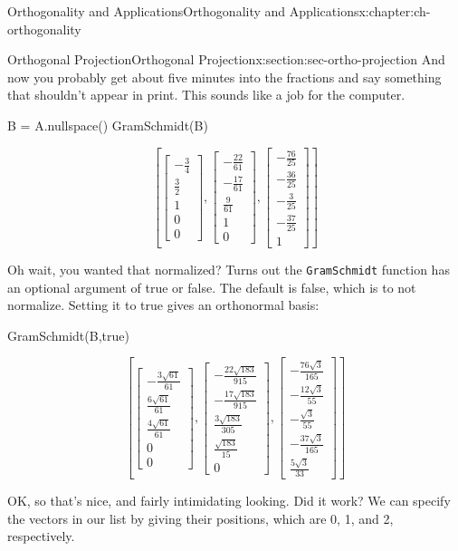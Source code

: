 \documentclass[oneside,10pt,]{book}
\newcommand{\mono}[1]{\texttt{#1}}
\numberwithin{equation}{section}
\newcommand{\bbm}{\begin{bmatrix}}
\newcommand{\ebm}{\end{bmatrix}}
\begin{document}
\begin{chapterptx}{Orthogonality and Applications}{}{Orthogonality and Applications}{}{}{x:chapter:ch-orthogonality}
\begin{sectionptx}{Orthogonal Projection}{}{Orthogonal Projection}{}{}{x:section:sec-ortho-projection}
And now you probably get about five minutes into the fractions and say something that shouldn't appear in print. This sounds like a job for the computer.%
\begin{sageinput}
B = A.nullspace()
GramSchmidt(B)
\end{sageinput}
\begin{sageoutput}
\[\left[\bbm -\frac34\\ \frac32\\1\\0\\0\ebm, \bbm -\frac{22}{61}\\-\frac{17}{61}\\ \frac{9}{61}\\1\\0\ebm, \bbm -\frac{76}{25}\\-\frac{36}{25}\\-\frac{3}{25}\\-\frac{37}{25}\\1\ebm\right]\]
\end{sageoutput}
Oh wait, you wanted that normalized? Turns out the \mono{GramSchmidt} function has an optional argument of true or false. The default is false, which is to not normalize. Setting it to true gives an orthonormal basis:%
\begin{sageinput}
GramSchmidt(B,true)
\end{sageinput}
\begin{sageoutput}
\[\left[\bbm -\frac{3\sqrt{61}}{61}\\ \frac{6\sqrt{61}}{61}\\ \frac{4\sqrt{61}}{61}\\0\\0\ebm,
\bbm -\frac{22\sqrt{183}}{915}\\-\frac{17\sqrt{183}}{915}\\ \frac{3\sqrt{183}}{305}\\ \frac{\sqrt{183}}{15}\\0\ebm,
\bbm -\frac{76\sqrt{3}}{165}\\-\frac{12\sqrt{3}}{55}\\-\frac{\sqrt{3}}{55}\\-\frac{37\sqrt{3}}{165}\\ \frac{5\sqrt{3}}{33}\ebm\right]\]
\end{sageoutput}
OK, so that's nice, and fairly intimidating looking. Did it work? We can specify the vectors in our list by giving their positions, which are 0, 1, and 2, respectively.%
\begin{sageinput}

\end{sageinput}
\end{sectionptx}
\end{chapterptx}
\end{document}
